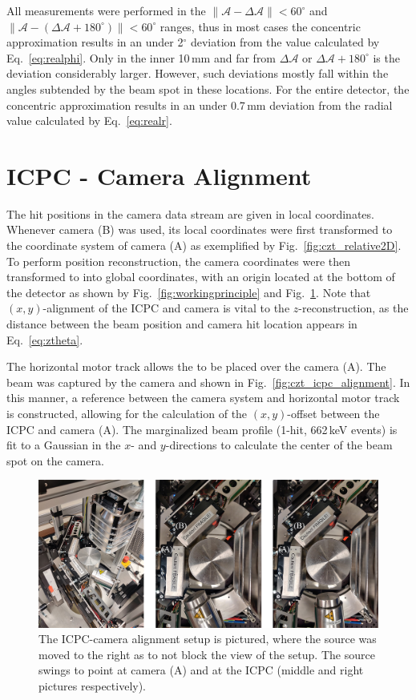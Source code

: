 All measurements were performed in the $\|\mathcal{A} - \Delta \mathcal{A}\| < 60^\circ$ and $\|\mathcal{A} - (\Delta \mathcal{A} + 180^\circ)\| < 60^\circ$ ranges, thus in most cases the concentric approximation results in an under 2$^\circ$ deviation from the value calculated by Eq.~\ref{eq:realphi}. Only in the inner 10\,mm and far from $\Delta \mathcal{A}$ or $\Delta \mathcal{A} + 180^\circ$ is the deviation considerably larger. However, such deviations mostly fall within the angles subtended by the \CsS{} beam spot in these locations. For the entire detector, the concentric approximation results in an under 0.7\,mm deviation from the radial value calculated by Eq.~\ref{eq:realr}.

\section{ICPC - Camera Alignment} \label{sec:detcamalignment}
The hit positions in the camera data stream are given in local coordinates. Whenever camera (B) was used, its local coordinates were first transformed to the coordinate system of camera (A) as exemplified by Fig.~\ref{fig:czt_relative2D}. To perform position reconstruction, the camera coordinates were then transformed to into global coordinates, with an origin located at the bottom of the detector as shown by Fig.~\ref{fig:workingprinciple} and Fig.~\ref{fig:czt_icpc_alignment_pictures}. Note that $(x,y)$-alignment of the ICPC and camera is vital to the $z$-reconstruction, as the distance between the \CsS{} beam position and camera hit location appears in Eq.~\ref{eq:ztheta}. 

The horizontal motor track allows the \CsS{} to be placed over the camera (A). The \CsS{} beam was captured by the camera and shown in Fig.~\ref{fig:czt_icpc_alignment}. In this manner, a reference between the camera system and horizontal motor track is constructed, allowing for the calculation of the $(x,y)$-offset between the ICPC and camera (A). The marginalized beam profile (1-hit, 662\,keV events) is fit to a Gaussian in the $x$- and $y$-directions to calculate the center of the beam spot on the camera. 
\begin{figure}[htb]
    \centering
    \includegraphics[width=6in]{figs/integration/czt_icpc_alignment_pictures_labeled.png}
    \caption{The ICPC-camera alignment setup is pictured, where the \CsS{} source was moved to the right as to not block the view of the setup. The \BaS{} source swings to point at camera (A) and at the ICPC (middle and right pictures respectively).}
    \label{fig:czt_icpc_alignment_pictures}
\end{figure}

